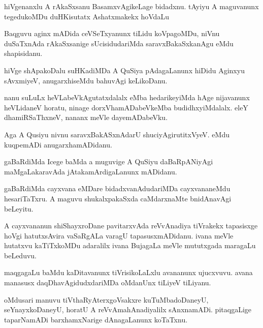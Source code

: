 \documentclass{article}
\begin{document}
\begin{mn}%
hiVgenanxlu A rAkaSxsanu BasamxvAgikeLage bidadxnu. tAyiyu A maguvanunx tegedukoMDu 
duHKisutatx Ashatxmakekx hoVdaLu
\end{mn}

\begin{mn}%
Baqguvu aginx mADida ceVSeTxyanunx tiLidu koVpagoMDu, niVnu duSaTxnAda rAkaSxsanige 
sUcisidudariMda saravxBakaSxkanAgu eMdu shapisidanu.
\end{mn}

\begin{mn}%
hiVge shApakoDalu suHKadiMDa A QuSiya pAdagaLanunx hiDidu Aginxyu sAvxmiyeV, 
anugarxhiseMdu bahuvAgi keLikoDanu.
\end{mn}

\begin{mn}%
nanu suLuLx heVLabeVkAgutatxdalalx eMba hedarikeyiMda hAge nijavanunx heVLidaneV horatu, 
ninage dorxVhamADabeVkeMba budidhxyiMdalalx. eleY dhamiRSaThxneV, nananx meVle dayemADabeVku.
\end{mn}

\begin{mn}%
Aga A Qusiyu nivnu saravxBakASxnAdarU shuciyAgirutitxVyeV. eMdu kuqpemADi anugarxhamADidanu.
\end{mn}

\begin{mn}%
gaBaRdiMda Icege baMda a muguvige A QuSiyu daBaRpANiyAgi maMgaLakaravAda 
jAtakamArdigaLanunx mADidanu.
\end{mn}

\begin{mn}%
gaBaRdiMda cayxvana eMDare bidadxvanAdudariMDa cayxvananeMdu hesariTaTxru. A maguvu 
shukalxpakaSxda caMdarxnaMte bnidAnavAgi beLeyitu.
\end{mn}

\begin{mn}%
A cayxvananun shiShayxroDane pavitarxvAda reVvAnadiya tiVrakekx tapasisxge hoVgi 
hatutxsAvira vaSaRgALa varagU tapasusxmADidanu. ivana meVle hutatxvu kaTiTxkoMDu adaralilx 
ivana BujagaLa meVle mututxgada maragaLu beLeduvu.
\end{mn}

\begin{mn}%
maqgagaLu baMdu kaDitavanunx tiVrisikoLaLxlu avananunx ujucxvuvu. avana manasusx 
daqDhavAgidudxdariMDa oMdanUnx tiLiyeV tiLiyanu.
\end{mn}

\begin{mn}%
oMdusari manuvu tiVthaRyAterxgoVsakxre kuTuMbadoDaneyU, seYnayxkoDaneyU, horatU A 
reVvAmahAnadiyalilx sAnxnamADi. pitaqgaLige taparNamADi barxhamxNarige dAnagaLanunx 
koTaTxnu. 
\end{mn}
\end{document}
